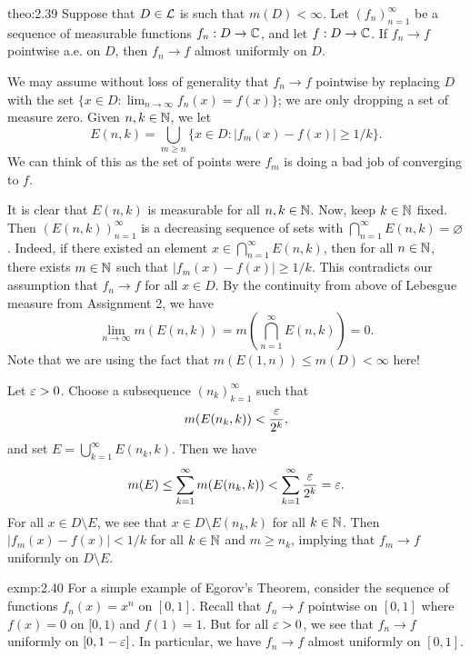 \begin{theo}{theo:2.39}
    Suppose that $D \in {\cal L}$ is such that $m(D) < \infty$. 
    Let $(f_n)_{n=1}^\infty$ be a sequence of measurable functions 
    $f_n : D \to \mathbb{C}$, and let $f : D \to \mathbb{C}$. If $f_n \to f$ pointwise 
    a.e. on $D$, then $f_n \to f$ almost uniformly on $D$. 
\end{theo}
\begin{pf}
    We may assume without loss of generality that $f_n \to f$ pointwise 
    by replacing $D$ with the set $\{x \in D : \lim_{n\to\infty} f_n(x) =
    f(x)\}$; we are only dropping a set of measure zero. Given $n, k \in \mathbb{N}$, 
    we let 
    \[ E(n, k) = \bigcup_{m\geq n} \{x \in D : |f_m(x) - f(x)| \geq 1/k\}. \] 
    We can think of this as the set of points were $f_m$ is doing a bad 
    job of converging to $f$. 
    
    It is clear that $E(n, k)$ is measurable for all $n, k \in \mathbb{N}$. 
    Now, keep $k \in \mathbb{N}$ fixed. Then $(E(n, k))_{n=1}^\infty$ is a decreasing 
    sequence of sets with $\bigcap_{n=1}^\infty E(n, k) = \varnothing$. 
    Indeed, if there existed an element $x \in \bigcap_{n=1}^\infty E(n, k)$, 
    then for all $n \in \mathbb{N}$, there exists $m \in \mathbb{N}$ such that 
    $|f_m(x) - f(x)| \geq 1/k$. This contradicts our assumption that 
    $f_n \to f$ for all $x \in D$. By the continuity from above 
    of Lebesgue measure from Assignment 2, we have 
    \[ \lim_{n\to\infty} m(E(n, k)) = m\!\left( \bigcap_{n=1}^\infty E(n, k) 
    \right) = 0. \] 
    Note that we are using the fact that $m(E(1, n)) \leq m(D) < \infty$ here! 
    
    Let $\varepsilon > 0$. Choose a subsequence $(n_k)_{k=1}^\infty$ such that 
    \[ m(E(n_k, k)) < \frac{\varepsilon}{2^k}, \] 
    and set $E = \bigcup_{k=1}^\infty E(n_k, k)$. Then we have 
    \[ m(E) \leq \sum_{k=1}^\infty m(E(n_k, k)) < \sum_{k=1}^\infty 
    \frac{\varepsilon}{2^k} = \varepsilon. \] 
    For all $x \in D \setminus E$, we see that $x \in D \setminus E(n_k, k)$
    for all $k \in \mathbb{N}$. Then $|f_m(x) - f(x)| < 1/k$ for all $k \in \mathbb{N}$ 
    and $m \geq n_k$, implying that $f_m \to f$ uniformly on $D \setminus E$. 
\end{pf}

\begin{exmp}{exmp:2.40}
    For a simple example of Egorov's Theorem, consider the sequence of functions 
    $f_n(x) = x^n$ on $[0, 1]$. Recall that $f_n \to f$ pointwise on $[0, 1]$ where 
    $f(x) = 0$ on $[0, 1)$ and $f(1) = 1$. But for all $\varepsilon > 0$, we see that 
    $f_n \to f$ uniformly on $[0, 1-\varepsilon]$. In particular, we have $f_n \to f$ 
    almost uniformly on $[0, 1]$. 
\end{exmp}

